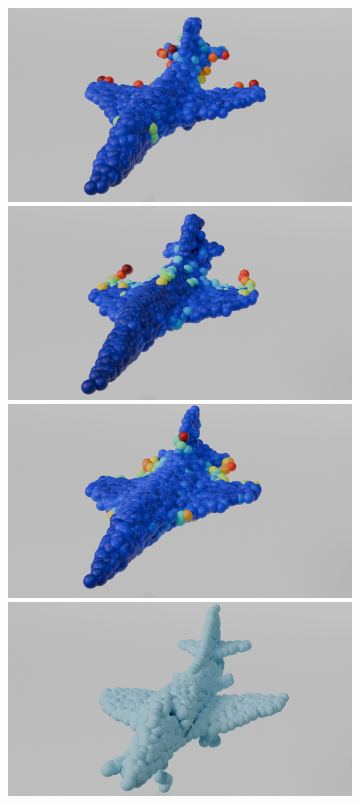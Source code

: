 \begin{figure}[htb]
\begin{subfigure}[t]{0.315\textwidth}
        \includegraphics[width=\textwidth]{figures/do_lin_ap3.png}
        \includegraphics[width=\textwidth]{figures/ens_lin_ap3.png}
        \includegraphics[width=\textwidth]{figures/iml_lin_ap3.png}
        \includegraphics[width=\textwidth]{figures/com_ap3.png}

\end{subfigure}
\end{figure}
